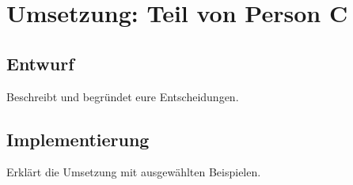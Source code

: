 \chapter{Umsetzung: Teil von Person C}
\section{Entwurf}
Beschreibt und begründet eure Entscheidungen.
\section{Implementierung}
Erklärt die Umsetzung mit ausgewählten Beispielen.
